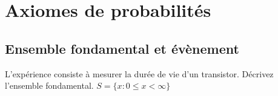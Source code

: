 \chapter{Axiomes de probabilités}
\section{Ensemble fondamental et évènement}

 L’expérience consiste à mesurer la durée de vie d’un transistor. Décrivez l’ensemble fondamental.
 $S =\{x : 0 \leq x < \infty\}$

